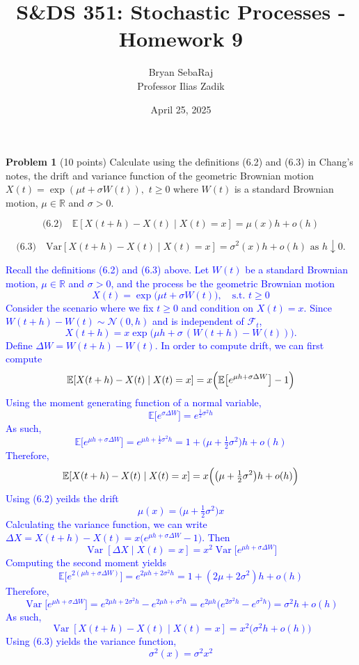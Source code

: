\documentclass{article}
\title{S\&DS 351: Stochastic Processes - Homework 9}
\author{Bryan SebaRaj \\[0.8em] Professor Ilias Zadik}
\date{April 25, 2025}
\begin{document}
\maketitle

\textbf{Problem 1}   (10 points) Calculate using the definitions (6.2) and (6.3) in Chang’s notes, the drift and variance function of the geometric Brownian motion 
$X(t) = \exp(\mu t + \sigma W(t)),$
$t \geq 0$ where $W(t)$ is a standard Brownian motion, $\mu \in \mathbb{R}$ and $\sigma > 0$.

%
\begin{equation*}
\text{(6.2)} \quad \mathbb{E}[X(t+h) - X(t) \mid X(t) = x] = \mu(x)h + o(h)
\end{equation*}

\begin{equation*}
    \text{(6.3)} \quad \text{Var}[X(t+h) - X(t) \mid X(t) = x] = \sigma^2(x)h + o(h) \text{ as } h \downarrow 0.
\end{equation*}

\textcolor{blue}{Recall the definitions (6.2) and (6.3) above.
Let $W(t)$ be a standard Brownian motion, $\mu\in\mathbb{R}$ and $\sigma>0$, and the process be the geometric Brownian motion
$$X(t)=\exp\bigl(\mu t+\sigma W(t)\bigr),\quad \text{s.t. } t\ge0$$
Consider the scenario where we fix $t\ge0$ and
condition on $X(t)=x$. 
Since $W(t+h)-W(t)\sim\mathcal N(0,h)$ and is
independent of $\mathcal F_{t}$, $$X(t+h)=x\exp\!\bigl(\mu
h+\sigma\,(W(t+h)-W(t))\bigr).$$ Define $\Delta W=W(t+h)-W(t)$.
In order to compute drift, we can first compute $$\mathbb{E}[X(t+h)-X(t)\mid
X(t)=x]=x\Bigl(\mathbb{E}\bigl[e^{\mu h+\sigma\Delta W}\bigr]-1\Bigr)$$ Using
the moment generating function of a normal variable,
$$\mathbb{E}\bigl[e^{\sigma\Delta W}\bigr]=e^{\tfrac12\sigma^{2}h}$$ As such,
$$\mathbb{E}\bigl[e^{\mu h+\sigma\Delta W}\bigr]=e^{\mu
h+\tfrac12\sigma^{2}h}=1+\!\bigl(\mu+\tfrac12\sigma^{2}\bigr)h+o(h)$$ Therefore,
$$\mathbb{E}[X(t+h)-X(t)\mid
X(t)=x]=x\Bigl(\bigl(\mu+\tfrac12\sigma^{2}\bigr)h+o(h)\Bigr)$$ 
Using 
(6.2) yeilds the drift $$\mu(x)=\bigl(\mu+\tfrac12\sigma^{2}\bigr)x$$
Calculating the variance function, we can write $\Delta X=X(t+h)-X(t)=x\bigl(e^{\mu
h+\sigma\Delta W}-1\bigr)$. Then $$\operatorname{Var}[\Delta X\mid
X(t)=x]=x^{2}\operatorname{Var}\!\bigl[e^{\mu h+\sigma\Delta W}\bigr]$$
Computing the second moment yields $$\mathbb{E}\bigl[e^{2(\mu h+\sigma\Delta
W)}\bigr]=e^{2\mu h+2\sigma^{2}h}=1+(2\mu+2\sigma^{2})h+o(h)$$ Therefore,
$$\operatorname{Var}\!\bigl[e^{\mu h+\sigma\Delta W}\bigr]=e^{2\mu
h+2\sigma^{2}h}-e^{2\mu h+\sigma^{2}h}=e^{2\mu
h}\bigl(e^{2\sigma^{2}h}-e^{\sigma^{2}h}\bigr)=\sigma^{2}h+o(h)$$ As such, 
$$\operatorname{Var}[X(t+h)-X(t)\mid
X(t)=x]=x^{2}\bigl(\sigma^{2}h+o(h)\bigr)$$ 
Using (6.3) yields the variance function,
$$\sigma^{2}(x)=\sigma^{2}x^{2}$$ }
\end{document}
